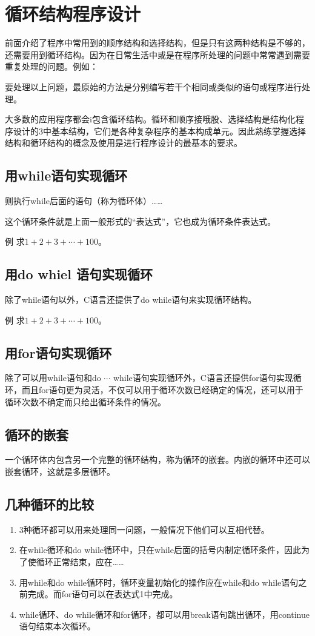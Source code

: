 \chapter{循环结构程序设计}
前面介绍了程序中常用到的顺序结构和选择结构，但是只有这两种结构是不够的，还需要用到循环结构。因为在日常生活中或是在程序所处理的问题中常常遇到需要重复处理的问题。例如：

要处理以上问题，最原始的方法是分别编写若干个相同或类似的语句或程序进行处理。

大多数的应用程序都会i包含循环结构。循环和顺序接哦股、选择结构是结构化程序设计的3中基本结构，它们是各种复杂程序的基本构成单元。因此熟练掌握选择结构和循环结构的概念及使用是进行程序设计的最基本的要求。
\section{用while语句实现循环}
则执行while后面的语句（称为循环体）……

这个循环条件就是上面一般形式的“表达式”，它也成为循环条件表达式。

例 求$1+2+3+\cdots +100$。
\section{用do whiel 语句实现循环}
除了while语句以外，C语言还提供了do while语句来实现循环结构。

例 求$1+2+3+\cdots +100$。
\section{用for语句实现循环}
除了可以用while语句和do $\cdots$ while语句实现循环外，C语言还提供for语句实现循环，而且for语句更为灵活，不仅可以用于循环次数已经确定的情况，还可以用于循环次数不确定而只给出循环条件的情况。
\section{循环的嵌套}
一个循环体内包含另一个完整的循环结构，称为循环的嵌套。内嵌的循环中还可以嵌套循环，这就是多层循环。
\section{几种循环的比较}
\begin{enumerate}
	\item 3种循环都可以用来处理同一问题，一般情况下他们可以互相代替。
	\item 在while循环和do while循环中，只在while后面的括号内制定循环条件，因此为了使循环正常结束，应在……
	\item 用while和do while循环时，循环变量初始化的操作应在while和do while语句之前完成。而for语句可以在表达式1中完成。
	\item while循环、do while循环和for循环，都可以用break语句跳出循环，用continue语句结束本次循环。
\end{enumerate}

